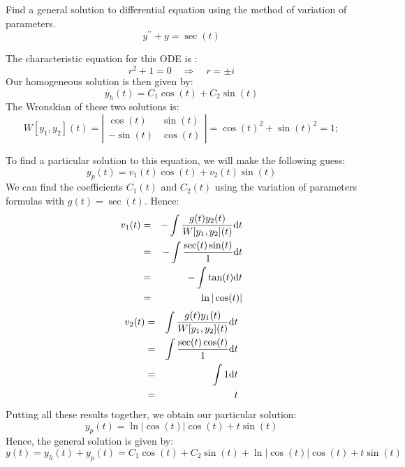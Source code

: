 \documentclass[11pt]{article}
\begin{document}
\begin{problem}
Find a general solution to differential equation using the method of variation of parameters.
\begin{equation*}
y^{\prime \prime} + y = \sec(t)
\end{equation*}
\end{problem}
\begin{solution}
The characteristic equation for this ODE is :
\begin{equation*}
r^2 +1 =0 \quad \Rightarrow \quad r = \pm i
\end{equation*}
Our homogeneous solution is then given by:
\begin{equation*}
y_{h}(t) = C_{1} \cos(t) + C_{2} \sin(t)
\end{equation*}
The Wronskian of these two solutions is:
\begin{equation*}
W[y_{1},y_{2}](t) = \left| \begin{array}{cc} \cos(t) & \sin(t) \\
-\sin(t) & \cos(t) \end{array} \right| = \cos(t)^2 + \sin(t)^2 =1;
\end{equation*}

To find a particular solution to this equation, we will make the following guess:
\begin{equation*}
y_{p}(t) = v_{1}(t) \cos(t) + v_{2}(t) \sin(t)
\end{equation*}
We can find the coefficients $C_{1}(t)$ and $C_{2}(t)$ using the variation of parameters formulas with $g(t) = \sec(t)$.
Hence:
\begin{eqnarray*}
v_{1}(t) & = & - \int \dfrac{g(t) y_{2}(t)}{W[y_{1},y_{2}](t)} {\rm d} t \\
& = & - \int \dfrac{\sec(t) \sin(t)}{1} {\rm d} t \\
& = & - \int \tan(t) {\rm d} t \\
& = & \ln|\cos(t)| \\
\end{eqnarray*}
\begin{eqnarray*}
v_{2}(t) & = &  \int \dfrac{g(t) y_{1}(t)}{W[y_{1},y_{2}](t)} {\rm d} t \\
& = &  \int \dfrac{\sec(t) \cos(t)}{1} {\rm d} t \\
& = & \int 1 {\rm d} t \\
& = & t \\
\end{eqnarray*}
Putting all these results together, we obtain our particular solution:
\begin{equation*}
y_{p}(t) = \ln|\cos(t)| \cos(t) + t \sin(t)
\end{equation*}
Hence, the general solution is given by:
\begin{equation*}
\boxed{y(t) = y_{h}(t) + y_{p}(t) = C_{1} \cos(t) + C_{2} \sin(t)+ \ln|\cos(t)| \cos(t) + t \sin(t)}
\end{equation*}
\end{solution}
\end{document}
